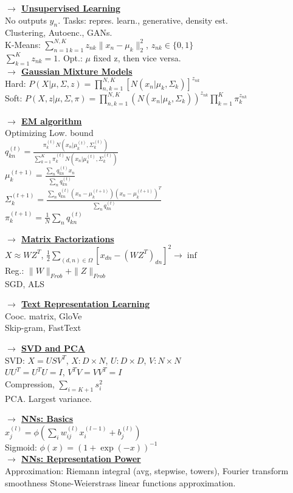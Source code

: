 \documentclass[]{article}
\newcommand{\mytitle}[1]{ {\bf $\rightarrow$ \underline{#1}}\\}
\begin{document}
\begin{multicols*}{2}
\mytitle{Unsupervised Learning}
No outputs $y_n$. Tasks: repres. learn., generative, density est.\\
Clustering, Autoenc., GANs.\\
K-Means: $\sum\limits_{n=1\,k=1}^{N,K}z_{nk}\|x_n-\mu_k\|_2^2$, $z_{nk}\in\{0,1\}$\\
$\sum\limits_{k=1}^Kz_{nk}=1$. Opt.: $\mu$ fixed z, then vice versa.\\

\mytitle{Gaussian Mixture Models}
Hard: $P(X|\mu,\Sigma,z)=\prod\limits_{n,k=1}^{N,K}\left[N(x_n|\mu_k,\Sigma_k)\right]^{z_{nk}}$\\
Soft: $P(X,z|\mu,\Sigma,\pi)=\prod\limits_{n,k=1}^{N,K}(N(x_n|\mu_k,\Sigma_k))^{z_{nk}}\prod\limits_{k=1}^K\pi_k^{z_{nk}}$

\mytitle{EM algorithm}
Optimizing Low. bound\\
$q_{kn}^{(t)}=\frac{\pi_k^{(t)}N(x_n|\mu_k^{(t)},\Sigma_k^{(t)})}{\sum\limits_{k=1}^K\pi_k^{(t)}N(x_n|\mu_k^{(t)},\Sigma_k^{(t)})}$\\
$\mu_k^{(t+1)}=\frac{\sum_nq_{kn}^{(t)}x_n}{\sum_n q_{kn}^{(t)}}$\\
$\Sigma_k^{(t+1)}=\frac{\sum_nq_{kn}^{(t)}(x_n-\mu_k^{(t+1)})(x_n-\mu_k^{(t+1)})^T}{\sum_nq_{kn}^{(t)}}$\\
$\pi_k^{(t+1)}=\frac{1}{N}\sum_nq_{kn}^{(t)}$

\mytitle{Matrix Factorizations}
$X\approx WZ^T$, $\frac{1}{2}\sum\limits_{(d,n)\in\Omega}\left[x_{dn}-(WZ^T)_{dn}\right]^2\to\inf$\\
Reg.: $\|W\|_{Frob}+\|Z\|_{Frob}$ \\
SGD, ALS


\mytitle{Text Representation Learning}
Cooc. matrix, GloVe\\
Skip-gram, FastText

\mytitle{SVD and PCA}
SVD: $X=USV^T$, $X\colon D\times N$, $U\colon D\times D$, $V\colon N\times N$\\
$UU^T=U^TU=I$, $V^TV=VV^T=I$\\
Compression, $\sum\limits_{i=K+1}s_i^2$\\
PCA. Largest variance.

\mytitle{NNs: Basics}
$x_j^{(l)}=\phi\left(\sum\limits_iw_{ij}^{(l)}x_i^{(l-1)}+b_j^{(l)}\right)$\\
Sigmoid: $\phi(x)=(1+\exp(-x))^{-1}$\\

\mytitle{NNs: Representation Power}
Approximation: Riemann integral (avg, stepwise, towers), Fourier transform smoothness
Stone-Weierstrass linear functions approximation.


\end{multicols*}
\end{document}
